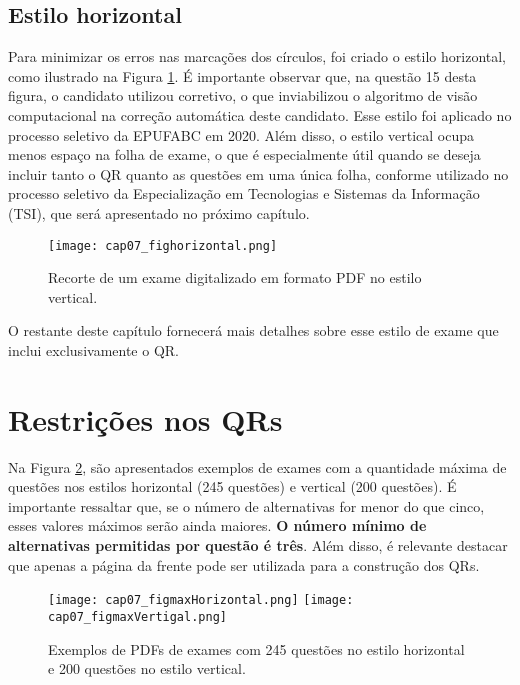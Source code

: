 \subsection{Estilo horizontal}

Para minimizar os erros nas marcações dos círculos, foi criado o estilo horizontal, como ilustrado na Figura \ref{fig:cap07_fighorizontal}. É importante observar que, na questão 15 desta figura, o candidato utilizou corretivo, o que inviabilizou o algoritmo de visão computacional na correção automática deste candidato. Esse estilo foi aplicado no processo seletivo da EPUFABC em 2020. Além disso, o estilo vertical ocupa menos espaço na folha de exame, o que é especialmente útil quando se deseja incluir tanto o QR quanto as questões em uma única folha, conforme utilizado no processo seletivo da Especialização em Tecnologias e Sistemas da Informação (TSI), que será apresentado no próximo capítulo.

\begin{figure}[htbp]
  \centering
  \texttt{[image: cap07\_fighorizontal.png]}
    \caption{Recorte de um exame digitalizado em formato PDF no estilo vertical.}
 \label{fig:cap07_fighorizontal}
\end{figure}

O restante deste capítulo fornecerá mais detalhes sobre esse estilo de exame que inclui exclusivamente o QR.

\section{Restrições nos QRs}

Na Figura \ref{fig:cap07_figmaxVertigal}, são apresentados exemplos de exames com a quantidade máxima de questões nos estilos horizontal (245 questões) e vertical (200 questões). É importante ressaltar que, se o número de alternativas for menor do que cinco, esses valores máximos serão ainda maiores. \textbf{O número mínimo de alternativas permitidas por questão é três}. Além disso, é relevante destacar que apenas a página da frente pode ser utilizada para a construção dos QRs.


\begin{figure}[htbp]
\centering
\texttt{[image: cap07\_figmaxHorizontal.png]}
\texttt{[image: cap07\_figmaxVertigal.png]}
\caption{Exemplos de PDFs de exames com 245 questões no estilo horizontal e 200 questões no estilo vertical.}
\label{fig:cap07_figmaxVertigal}
\end{figure}

